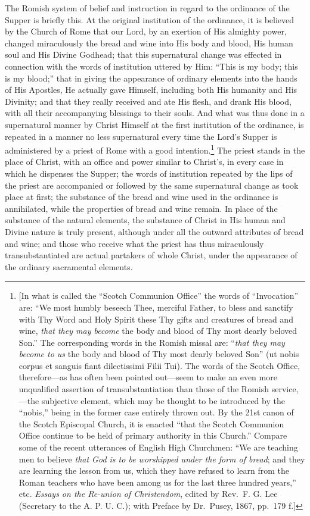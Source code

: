 \documentclass[english,]{book}
\begin{document}
The Romish system of belief and instruction in regard to the ordinance of the Supper is briefly this. At the original institution of the ordinance, it is believed by the Church of Rome that our Lord, by an exertion of His almighty power, changed miraculously the bread and wine into His body and blood, His human soul and His Divine Godhead; that this supernatural change was effected in connection with the words of institution uttered by Him: ``This is my body; this is my blood;'' that in giving the appearance of ordinary elements into the hands of His Apostles, He actually gave Himself, including both His humanity and His Divinity; and that they really received and ate His flesh, and drank His blood, with all their accompanying blessings to their souls. And what was thus done in a supernatural manner by Christ Himself at the first institution of the ordinance, is repeated in a manner no less supernatural every time the Lord's Supper is administered by a priest of Rome with a good intention.\footnote{{[}In what is called the ``Scotch Communion Office'' the words of ``Invocation'' are: ``We most humbly beseech Thee, merciful Father, to bless and sanctify with Thy Word and Holy Spirit these Thy gifts and creatures of bread and wine, \emph{that they may become} the body and blood of Thy most dearly beloved Son.'' The corresponding words in the Romish missal are: ``\emph{that they may become to us} the body and blood of Thy most dearly beloved Son'' (ut nobis corpus et sanguis fiant dilectissimi Filii Tui). The words of the Scotch Office, therefore---as has often been pointed out---seem to make an even more unqualified assertion of transubstantiation than those of the Romish service,---the subjective element, which may be thought to be introduced by the ``nobis,'' being in the former case entirely thrown out. By the 21st canon of the Scotch Episcopal Church, it is enacted ``that the Scotch Communion Office continue to be held of primary authority in this Church.'' Compare some of the recent utterances of English High Churchmen: ``We are teaching men to believe \emph{that God is to be worshipped under the form of bread}; and they are learning the lesson from us, which they have refused to learn from the Roman teachers who have been among us for the last three hundred years,'' etc. \emph{Essays on the Re-union of Christendom}, edited by Rev.~F. G. Lee (Secretary to the A. P. U. C.); with Preface by Dr.~Pusey, 1867, pp.~179 f.{]}} The priest stands in the place of Christ, with an office and power similar to Christ's, in every case in which he dispenses the Supper; the words of institution repeated by the lips of the priest are accompanied or followed by the same supernatural change as took place at first; the substance of the bread and wine used in the ordinance is annihilated, while the properties of bread and wine remain. In place of the substance of the natural elements, the substance of Christ in His human and Divine nature is truly present, although under all the outward attributes of bread and wine; and those who receive what the priest has thus miraculously transubstantiated are actual partakers of whole Christ, under the appearance of the ordinary sacramental elements.
\end{document}
